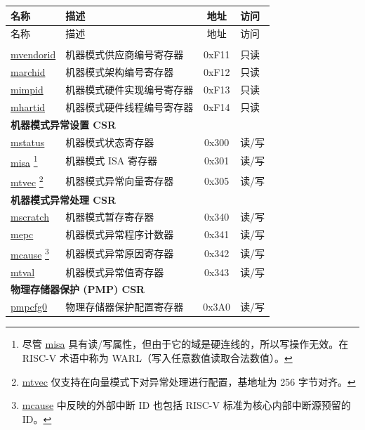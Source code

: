
\begin{longtable}{ | p{4.0cm} | p{8.4cm} | c | l | }
\hline\rowcolor{lightgray}
名称 & 描述 & 地址 & 访问 \\ \hline
\endfirsthead
\hline
\rowcolor{lightgray}
名称 & 描述 & 地址 & 访问 \\
\hline
\endhead
\endfoot

\multicolumn{4}{|l|}{\textbf{机器模式信息 CSR}} \\\hline
\hyperref[regdesc:MVENDORID]{mvendorid} & 机器模式供应商编号寄存器 & 0xF11 & 只读 \\\hline
\hyperref[regdesc:MARCHID]{marchid} & 机器模式架构编号寄存器 & 0xF12 & 只读 \\\hline
\hyperref[regdesc:MIMPID]{mimpid} & 机器模式硬件实现编号寄存器 & 0xF13 & 只读 \\\hline
\hyperref[regdesc:MHARTID]{mhartid} & 机器模式硬件线程编号寄存器 & 0xF14 & 只读 \\\hline
\multicolumn{4}{|l|}{\textbf{机器模式异常设置 CSR}} \\\hline
\hyperref[regdesc:MSTATUS]{mstatus} & 机器模式状态寄存器 & 0x300 & 读/写 \\\hline
\hyperref[regdesc:MISA]{misa} \footnote{尽管 \hyperref[regdesc:MISA]{misa} 具有读/写属性，但由于它的域是硬连线的，所以写操作无效。在 RISC-V 术语中称为 WARL（写入任意数值读取合法数值）。} & 机器模式 ISA 寄存器 & 0x301 & 读/写 \\\hline
\hyperref[regdesc:MTVEC]{mtvec} \footnote{\hyperref[regdesc:MTVEC]{mtvec} 仅支持在向量模式下对异常处理进行配置，基地址为 256 字节对齐。} & 机器模式异常向量寄存器 & 0x305 & 读/写 \\\hline
\multicolumn{4}{|l|}{\textbf{机器模式异常处理 CSR}} \\\hline
\hyperref[regdesc:MSCRATCH]{mscratch} & 机器模式暂存寄存器 & 0x340 & 读/写 \\\hline
\hyperref[regdesc:MEPC]{mepc} & 机器模式异常程序计数器 & 0x341 & 读/写 \\\hline
\hyperref[regdesc:MCAUSE]{mcause} \footnote{\hyperref[regdesc:MCAUSE]{mcause} 中反映的外部中断 ID 也包括 RISC-V 标准为核心内部中断源预留的 ID。} & 机器模式异常原因寄存器 & 0x342 & 读/写 \\\hline
\hyperref[regdesc:MTVAL]{mtval} & 机器模式异常值寄存器 & 0x343 & 读/写 \\\hline
\multicolumn{4}{|l|}{\textbf{物理存储器保护 (PMP) CSR}} \\\hline
\hyperref[sec:riscvcpu-pmp-reg-desc]{pmpcfg0} & 物理存储器保护配置寄存器 & 0x3A0 & 读/写 \\\hline

\end{longtable}
